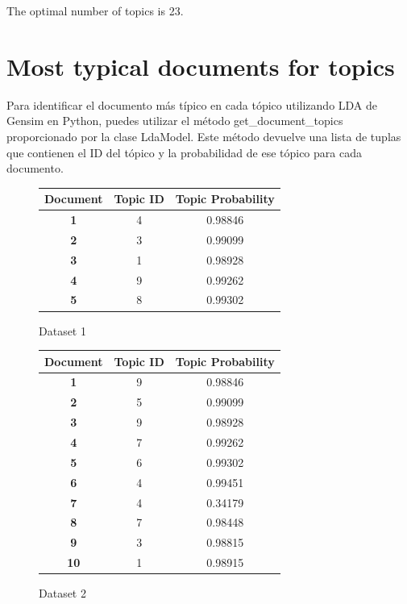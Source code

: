 \documentclass[10pt]{article} %
\begin{document}
	The optimal number of topics is 23.
	
	\section{Most typical documents for topics}
	Para identificar el documento más típico en cada tópico utilizando LDA de Gensim en Python, puedes utilizar el método get\_document\_topics proporcionado por la clase LdaModel. Este método devuelve una lista de tuplas que contienen el ID del tópico y la probabilidad de ese tópico para cada documento.
	
	\begin{figure}[H]
		\centering
		\begin{tabular}{|c|c|c|}
			\hline \textbf{Document} & \textbf{Topic ID} & \textbf{Topic Probability}  \\  
			\hline \textbf{1} & 4 & 0.98846 \\
			\hline \textbf{2} & 3 & 0.99099 \\
			\hline \textbf{3} & 1 & 0.98928 \\
			\hline \textbf{4} & 9 & 0.99262 \\
			\hline \textbf{5} & 8 & 0.99302 \\
			\hline
		\end{tabular}
		\caption{Dataset 1}
	\end{figure}
	
	\begin{figure}[H]
		\centering
		\begin{tabular}{|c|c|c|}
			\hline \textbf{Document} & \textbf{Topic ID} & \textbf{Topic Probability}  \\  
			\hline \textbf{1} & 9 & 0.98846 \\
			\hline \textbf{2} & 5 & 0.99099\\
			\hline \textbf{3} & 9 & 0.98928 \\
			\hline \textbf{4} & 7 & 0.99262 \\
			\hline \textbf{5} & 6 & 0.99302 \\
			\hline \textbf{6} & 4  & 0.99451 \\
			\hline \textbf{7} & 4 & 0.34179 \\
			\hline \textbf{8} & 7 & 0.98448 \\
			\hline \textbf{9} & 3 & 0.98815 \\
			\hline \textbf{10} & 1 & 0.98915 \\
			\hline
		\end{tabular}
		\caption{Dataset 2}
	\end{figure}
\end{document}
